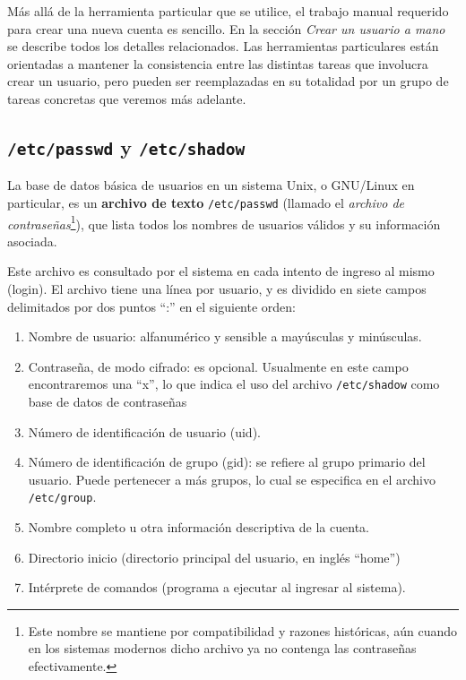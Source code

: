 \documentclass[12pt]{article}
\begin{document}
Más allá de la herramienta particular que se utilice,  
el trabajo manual requerido para crear una nueva cuenta es sencillo. En la sección
\textit{Crear un usuario a mano} se describe todos los detalles relacionados. 
Las herramientas particulares están orientadas a mantener la consistencia entre 
las distintas tareas que involucra crear un usuario, pero pueden ser reemplazadas
en su totalidad por un grupo de tareas concretas que veremos más adelante. 


\subsection*{\texttt{/etc/passwd} y \texttt{/etc/shadow}}

La base de datos básica de usuarios en un sistema Unix, o GNU/Linux en particular, 
es un \textbf{archivo de texto} \texttt{/etc/passwd} (llamado el \textit{archivo de
contraseñas}\footnote{Este nombre se mantiene por compatibilidad y razones históricas, aún cuando 
en los sistemas modernos dicho archivo ya no contenga las contraseñas efectivamente.}), 
que lista todos los nombres de usuarios válidos y su información asociada. 

Este archivo es consultado por el sistema en cada intento de ingreso al mismo (login).
El archivo tiene una línea por usuario, y es dividido en siete campos delimitados por 
dos puntos ``:'' en el siguiente orden:

	\begin{enumerate}
	\item{Nombre de usuario: alfanumérico y sensible a mayúsculas y minúsculas.}
	\item{Contraseña, de modo cifrado: es opcional. Usualmente en este campo encontraremos 
	una ``x'', lo que indica el uso del archivo \texttt{/etc/shadow} como base de datos de 
	contraseñas}
	\item{Número de identificación de usuario (uid).} 
	\item{Número de identificación de grupo (gid): se refiere al grupo primario del usuario. Puede 
	pertenecer a más grupos, lo cual se especifica en el archivo \texttt{/etc/group}}.
	\item{Nombre completo u otra información descriptiva de la cuenta.}
	\item{Directorio inicio (directorio principal del usuario, en inglés ``home'')}
	\item{Intérprete de comandos (programa a ejecutar al ingresar al sistema).}
	\end{enumerate}
\end{document}

